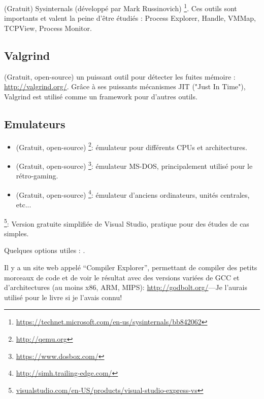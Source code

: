 (Gratuit) Sysinternals (développé par Mark Russinovich)
\footnote{\url{https://technet.microsoft.com/en-us/sysinternals/bb842062}}.
Ces outils sont importants et valent la peine d'être étudiés : Process Explorer, Handle, VMMap, TCPView, Process Monitor.

\subsection{Valgrind}

(Gratuit, open-source) un puissant outil pour détecter les fuites mémoire : \url{http://valgrind.org/}.
Grâce à ses puissants mécanismes \ac{JIT} ("Just In Time"), Valgrind est utilisé comme un framework pour d'autres outils.


\subsection{Emulateurs}

\begin{itemize}
\item (Gratuit, open-source) \footnote{\url{http://qemu.org}}: émulateur pour différents CPUs et architectures.

\item (Gratuit, open-source) \footnote{\url{https://www.dosbox.com/}}: émulateur MS-DOS, principalement utilisé pour le rétro-gaming.

\item (Gratuit, open-source) \footnote{\url{http://simh.trailing-edge.com/}}: émulateur d'anciens ordinateurs, unités centrales, etc...
\end{itemize}


\footnote{\href{http://go.yurichev.com/17034}{visualstudio.com/en-US/products/visual-studio-express-vs}}:
Version gratuite simplifiée de Visual Studio, pratique pour des études de cas simples.

Quelques options utiles : .

Il y a un site web appelé ``Compiler Explorer'', permettant de compiler des petits
morceaux de code et de voir le résultat avec des versions variées de GCC et d'architectures
(au moins x86, ARM, MIPS): \url{http://godbolt.org/}---Je l'aurais utilisé
pour le livre si je l'avais connu!

